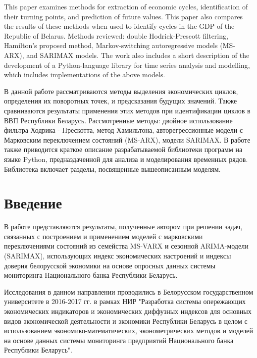\documentclass[a4paper,14pt]{extreport}
\begin{document}
	\maketitle
	

	\clearpage
	
	\renewcommand{\contentsname}{Содержание}
	\tableofcontents
	
	\clearpage
	
	\bsuabstract
	{
		This paper examines methods for extraction of economic cycles, identification of their turning points, and prediction of future values. This paper also compares the results of these methods when used to identify cycles in the GDP of the Republic of Belarus. Methods reviewed: double Hodrick-Prescott filtering, Hamilton's proposed method,  Markov-switching autoregressive models (MS-ARX), and SARIMAX models. The work also includes a short description of the development of a Python-language library for time series analysis and modelling, which includes implementations of the above models.
		
	}{
		В данной работе рассматриваются методы выделения экономических циклов, определения их поворотных точек, и предсказания будущих значений. Также сравниваются результаты применения этих методов при идентификации циклов в ВВП Республики Беларусь. Рассмотренные методы: двойное использование фильтра Ходрика - Прескотта, метод Хамильтона, авторегрессионные модели с Марковским переключением состояний (MS-ARX), модели SARIMAX. В работе также приводится краткое описание разрабатываемой библиотеки программ на языке Python, предназдаченной для анализа и моделирования временных рядов. Библиотека включает разделы, посвященные вышеописанным моделям.
	}
	
	\clearpage
				
	
	\chapter*{Введение}
	В работе представляются результаты, полученные автором при решении задач, связанных с построением и применением моделей с марковскими переключениями состояний из семейства MS-VARX и сезонной ARIMA-модели (SARIMAX), использующих индекс экономических настроений и индексы доверия белорусской экономики на основе опросных данных системы мониторинга Национального банка Республики Беларусь.
	
	Исследования в данном направлении проводились в Белорусском государственном университете в 2016-2017 гг. в рамках НИР "Разработка системы опережающих экономических индикаторов и экономических диффузных индексов для основных видов экономической деятельности и экономики Республики Беларусь в целом с использованием экономико-математических, эконометрических методов и моделей на основе данных системы мониторинга предприятий Национального банка Республики Беларусь".
	
\end{document}
